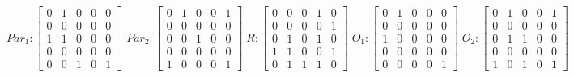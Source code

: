      $$
        Par_{1} : \begin{bmatrix}
            0 & 1 & 0 & 0 & 0 \\
            0 & 0 & 0 & 0 & 0 \\
            1 & 1 & 0 & 0 & 0 \\
			0 & 0 & 0 & 0 & 0 \\
            0 & 0 & 1 & 0 & 1 
        \end{bmatrix}
        \;
        Par_{2} : \begin{bmatrix}
            0 & 1 & 0 & 0 & 1 \\
            0 & 0 & 0 & 0 & 0 \\
            0 & 0 & 1 & 0 & 0 \\
            0 & 0 & 0 & 0 & 0 \\
            1 & 0 & 0 & 0 & 1
        \end{bmatrix}
        \;
        R : \begin{bmatrix}
            0 & 0 & 0 & 1 & 0 \\
            0 & 0 & 0 & 0 & 1 \\
            0 & 1 & 0 & 1 & 0 \\
            1 & 1 & 0 & 0 & 1 \\
            0 & 1 & 1 & 1 & 0
        \end{bmatrix}
        \;
        O_{1} : \begin{bmatrix}
            0 & 1 & 0 & 0 & 0 \\
            0 & 0 & 0 & 0 & 0 \\
            1 & 0 & 0 & 0 & 0 \\
            0 & 0 & 0 & 0 & 0 \\
            0 & 0 & 0 & 0 & 1
        \end{bmatrix}
        \;
        O_{2} : \begin{bmatrix}
            0 & 1 & 0 & 0 & 1 \\
            0 & 0 & 0 & 0 & 0 \\
            0 & 1 & 1 & 0 & 0 \\
            0 & 0 & 0 & 0 & 0 \\
            1 & 0 & 1 & 0 & 1
        \end{bmatrix}
    $$ 
